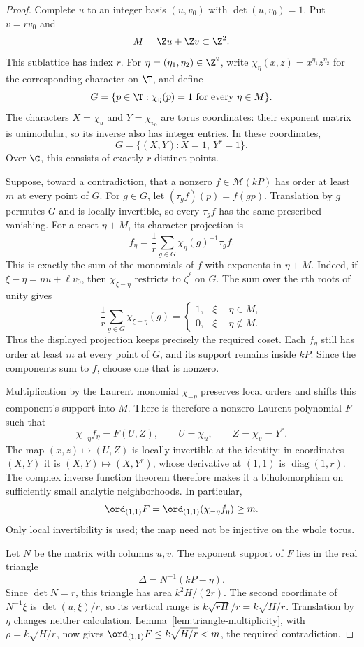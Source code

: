 \begin{proof}
Complete $u$ to an integer basis $(u,v_0)$ with $\det(u,v_0)=1$.
Put $v=rv_0$ and
\[
 M=\Z u+\Z v\subset\Z^2.
\]
This sublattice has index $r$.  For $\eta=(\eta_1,\eta_2)\in\Z^2$,
write $\chi_\eta(x,z)=x^{\eta_1}z^{\eta_2}$ for the corresponding
character on $\T$, and define
\[
 G=\{p\in\T:\chi_\eta(p)=1\text{ for every }\eta\in M\}.
\]
The characters $X=\chi_u$ and $Y=\chi_{v_0}$ are torus coordinates:
their exponent matrix is unimodular, so its inverse also has integer
entries.  In these coordinates,
\[
 G=\{(X,Y):X=1,\ Y^r=1\}.
\]
Over $\C$, this consists of exactly $r$ distinct points.

Suppose, toward a contradiction, that a nonzero
$f\in\mathcal M(kP)$ has order at least $m$ at every point of $G$.
For $g\in G$, let $(\tau_gf)(p)=f(gp)$.  Translation by $g$ permutes
$G$ and is locally invertible, so every $\tau_gf$ has the same prescribed
vanishing.  For a coset $\eta+M$, its character projection is
\[
 f_\eta=\frac1r\sum_{g\in G}\chi_\eta(g)^{-1}\tau_gf.
\]
This is exactly the sum of the monomials of $f$ with exponents in
$\eta+M$.  Indeed, if $\xi-\eta=n u+\ell v_0$, then
$\chi_{\xi-\eta}$ restricts to $\zeta^\ell$ on $G$.  The sum over the
$r$th roots of unity gives
\[
 \frac1r\sum_{g\in G}\chi_{\xi-\eta}(g)
 =\begin{cases}
 1,&\xi-\eta\in M,\\
 0,&\xi-\eta\notin M.
 \end{cases}
\]
Thus the displayed projection keeps precisely the required coset.
Each $f_\eta$ still has order at least $m$ at every point of $G$, and its
support remains inside $kP$.  Since the components sum to $f$, choose
one that is nonzero.

Multiplication by the Laurent monomial $\chi_{-\eta}$ preserves local
orders and shifts this component's support into $M$.  There is therefore
a nonzero Laurent polynomial $F$ such that
\[
 \chi_{-\eta}f_\eta=F(U,Z),
 \qquad U=\chi_u,
 \qquad Z=\chi_v=Y^r.
\]
The map $(x,z)\mapsto(U,Z)$ is locally invertible at the identity:
in coordinates $(X,Y)$ it is $(X,Y)\mapsto(X,Y^r)$, whose derivative at
$(1,1)$ is $\operatorname{diag}(1,r)$.  The complex inverse function theorem therefore makes it a biholomorphism
on sufficiently small analytic neighborhoods.  In particular,
\[
 \ord_{(1,1)}F
 =\ord_{(1,1)}(\chi_{-\eta}f_\eta)\geq m.
\]
Only local invertibility is used; the map need not be injective on the
whole torus.

Let $N$ be the matrix with columns $u,v$.  The exponent support of $F$
lies in the real triangle
\[
 \Delta=N^{-1}(kP-\eta).
\]
Since $\det N=r$, this triangle has area $k^2H/(2r)$.  The second
coordinate of $N^{-1}\xi$ is $\det(u,\xi)/r$, so its vertical range is
$k\sqrt{rH}/r=k\sqrt{H/r}$.  Translation by $\eta$ changes neither
calculation.  Lemma~\ref{lem:triangle-multiplicity}, with
$\rho=k\sqrt{H/r}$, now gives
$\ord_{(1,1)}F\leq k\sqrt{H/r}<m$, the required contradiction.
\end{proof}

